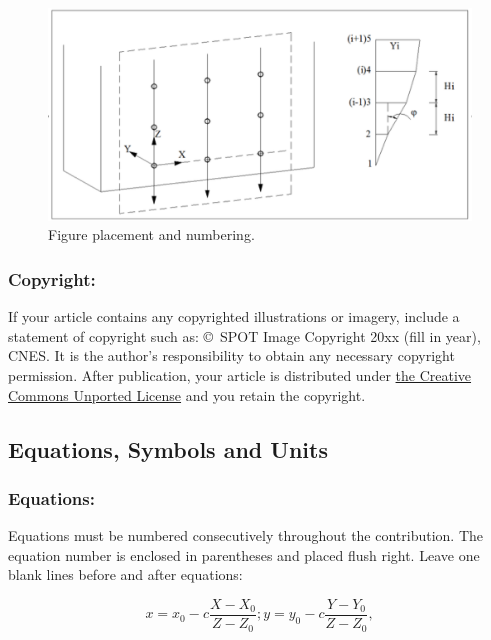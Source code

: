\documentclass{isprs} %
\begin{document}
\begin{figure}[ht!]
\begin{center}
		\includegraphics[width=1.0\columnwidth]{figures/test_sites/fig1.eps}
	\caption{Figure placement and numbering.}
\label{fig:figure_placement}
\end{center}
\end{figure}


\subsubsection{Copyright:}\label{sec:Copyright}

If your article contains any copyrighted illustrations or imagery,
include a statement of copyright such as: \copyright~SPOT Image Copyright 20xx
(fill in year), CNES\@. It is the author's responsibility to obtain any necessary
copyright permission. After publication, your article is distributed under \underline{the Creative
Commons Unported License} and you retain the copyright.

\subsection{Equations, Symbols and Units}\label{sec:Equations, Symbols and Units}

\subsubsection{Equations:}\label{sec:Equations}

Equations must be numbered consecutively throughout the contribution. The equation
number is enclosed in parentheses and placed flush right. Leave one blank lines
before and after equations:


\begin{equation}\label{equ:1}
	x = x_0 -c \frac{X - X_0}{Z - Z_0}; y = y_0 -c \frac{Y - Y_0}{Z - Z_0},
\end{equation}
\end{document}
